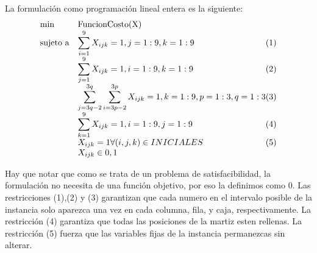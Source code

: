    
  La formulación como programación lineal entera es la siguiente:	
\begin{equation*}
\begin{array}{ll@{}ll}
\text{min}  & \displaystyle $FuncionCosto(X)$ &\\
\text{sujeto a} & \displaystyle\sum\limits_{i=1}^{9} X_{ijk}=1, j=1:9,k=1:9 & (1)\\
		& \displaystyle\sum\limits_{j=1}^{9} X_{ijk}=1,i=1:9,k=1:9 & (2)\\
		& \displaystyle\sum\limits_{j=3q-2}^{3q} \sum\limits_{i=3p-2}^{3p} X_{ijk}=1, k=1:9,p=1:3,q=1:3 & (3) \\
                 & \displaystyle\sum\limits_{k=1}^{9} X_{ijk}=1, i=1:9,j=1:9 & (4)\\
                 & X_{ijk}=1 \forall (i,j,k) \in INICIALES &(5) \\
                 &  X_{ijk} \in {0,1}
\end{array}
\end{equation*}

 
 Hay que notar que como se trata de un problema de satisfacibilidad, la formulación no necesita de una función objetivo, por eso la definimos como 0. Las restricciones (1),(2) y (3) garantizan que cada numero en el intervalo posible de la instancia solo aparezca una vez en cada columna, fila, y caja, respectivamente. La restricción (4) garantiza que todas las posiciones de la martiz esten rellenas. La restricción (5) fuerza que las variables fijas de la instancia permanezcas sin alterar.
